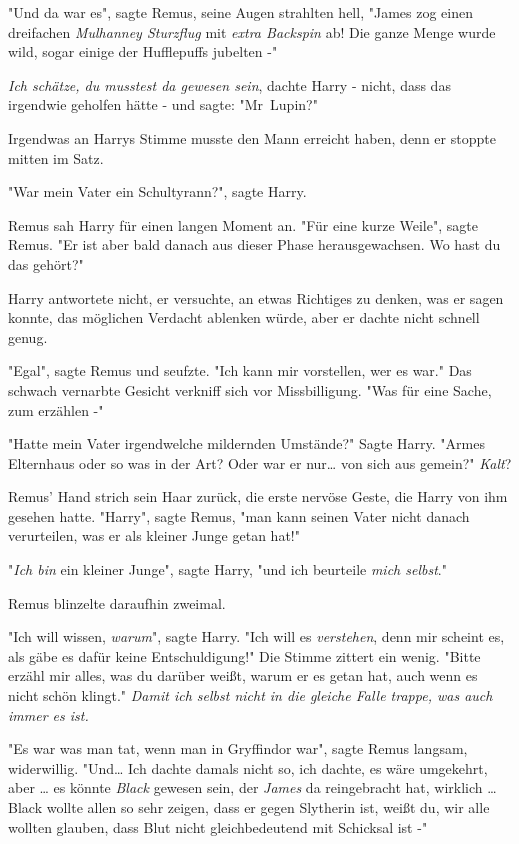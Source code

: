 {"Und da war es", sagte Remus, seine Augen strahlten hell, "James zog einen dreifachen \emph{Mulhanney Sturzflug} mit \emph{extra Backspin} ab! Die ganze Menge wurde wild, sogar einige der Hufflepuffs jubelten -"

\emph{Ich schätze, du musstest da gewesen sein}, dachte Harry - nicht, dass das irgendwie geholfen hätte - und sagte: "Mr~Lupin?"

Irgendwas an Harrys Stimme musste den Mann erreicht haben, denn er stoppte mitten im Satz.

"War mein Vater ein Schultyrann?", sagte Harry.

Remus sah Harry für einen langen Moment an. "Für eine kurze Weile", sagte Remus. "Er ist aber bald danach aus dieser Phase herausgewachsen. Wo hast du das gehört?"

Harry antwortete nicht, er versuchte, an etwas Richtiges zu denken, was er sagen konnte, das möglichen Verdacht ablenken würde, aber er dachte nicht schnell genug.

"Egal", sagte Remus und seufzte. "Ich kann mir vorstellen, wer es war." Das schwach vernarbte Gesicht verkniff sich vor Missbilligung. "Was für eine Sache, zum erzählen -"

"Hatte mein Vater irgendwelche mildernden Umstände?" Sagte Harry. "Armes Elternhaus oder so was in der Art? Oder war er nur… von sich aus gemein?" \emph{Kalt}?

Remus' Hand strich sein Haar zurück, die erste nervöse Geste, die Harry von ihm gesehen hatte. "Harry", sagte Remus, "man kann seinen Vater nicht danach verurteilen, was er als kleiner Junge getan hat!"

"\emph{Ich bin} ein kleiner Junge", sagte Harry, "und ich beurteile \emph{mich selbst}."

Remus blinzelte daraufhin zweimal.

"Ich will wissen, \emph{warum}", sagte Harry. "Ich will es \emph{verstehen}, denn mir scheint es, als gäbe es dafür keine Entschuldigung!" Die Stimme zittert ein wenig. "Bitte erzähl mir alles, was du darüber weißt, warum er es getan hat, auch wenn es nicht schön klingt." \emph{Damit ich selbst nicht in die gleiche Falle trappe, was auch immer es ist.}

"Es war was man tat, wenn man in Gryffindor war", sagte Remus langsam, widerwillig. "Und… Ich dachte damals nicht so, ich dachte, es wäre umgekehrt, aber … es könnte \emph{Black} gewesen sein, der \emph{James} da reingebracht hat, wirklich … Black wollte allen so sehr zeigen, dass er gegen Slytherin ist, weißt du, wir alle wollten glauben, dass Blut nicht gleichbedeutend mit Schicksal ist -"

}
